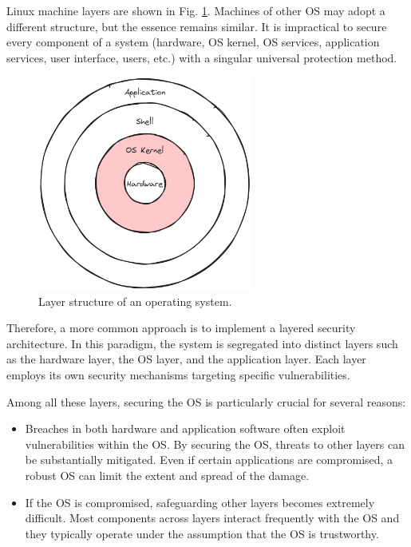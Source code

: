 Linux machine layers are shown in Fig. \ref{ch:ossec:fig:layerstructure}. Machines of other OS may adopt a different structure, but the essence remains similar. It is impractical to secure every component of a system (hardware, OS kernel, OS services, application services, user interface, users, etc.) with a singular universal protection method.
\begin{figure}[htbp]
	\centering
	\includegraphics[width=200pt]{chapters/ch-computer-security-basics/figures/os_layer.png}
	\caption{Layer structure of an operating system.} \label{ch:ossec:fig:layerstructure}
\end{figure}
Therefore, a more common approach is to implement a layered security architecture. In this paradigm, the system is segregated into distinct layers such as the hardware layer, the OS layer, and the application layer. Each layer employs its own security mechanisms targeting specific vulnerabilities.

Among all these layers, securing the OS is particularly crucial for several reasons:
\begin{itemize}
	\item Breaches in both hardware and application software often exploit vulnerabilities within the OS. By securing the OS, threats to other layers can be substantially mitigated. Even if certain applications are compromised, a robust OS can limit the extent and spread of the damage.
	\item If the OS is compromised, safeguarding other layers becomes extremely difficult. Most components across layers interact frequently with the OS and they typically operate under the assumption that the OS is trustworthy.
\end{itemize}

